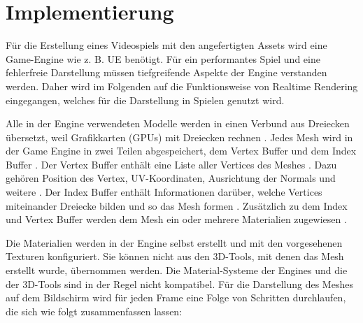 \section{Implementierung}\label{Implementierung1}
Für die Erstellung eines Videospiels mit den angefertigten Assets wird eine Game-Engine wie z. B. UE benötigt. Für ein performantes Spiel und eine fehlerfreie Darstellung müssen tiefgreifende Aspekte der Engine verstanden werden. Daher wird im Folgenden auf die Funktionsweise von Realtime Rendering eingegangen, welches für die Darstellung in Spielen genutzt wird.
\par
Alle in der Engine verwendeten Modelle werden in einen Verbund aus Dreiecken übersetzt, weil Grafikkarten (GPUs) mit Dreiecken rechnen \parencite{gpu}. Jedes Mesh wird in der Game Engine in zwei Teilen abgespeichert, dem Vertex Buffer und dem Index Buffer \parencite{gpu}. Der Vertex Buffer enthält eine Liste aller Vertices des Meshes \parencite{gpu}. Dazu gehören Position des Vertex, UV-Koordinaten, Ausrichtung der Normals und weitere \parencite{gpu}. Der Index Buffer enthält Informationen darüber, welche Vertices miteinander Dreiecke bilden und so das Mesh formen \parencite{gpu}. Zusätzlich zu dem Index und Vertex Buffer werden dem Mesh ein oder mehrere Materialien zugewiesen \parencite{gpu}. 
\par
Die Materialien werden in der Engine selbst erstellt und mit den vorgesehenen Texturen konfiguriert. Sie können nicht aus den 3D-Tools, mit denen das Mesh erstellt wurde, übernommen werden. Die Material-Systeme der Engines und die der 3D-Tools sind in der Regel nicht kompatibel.
\newpage
Für die Darstellung des Meshes auf dem Bildschirm wird für jeden Frame eine Folge von Schritten durchlaufen, die sich wie folgt zusammenfassen lassen:
